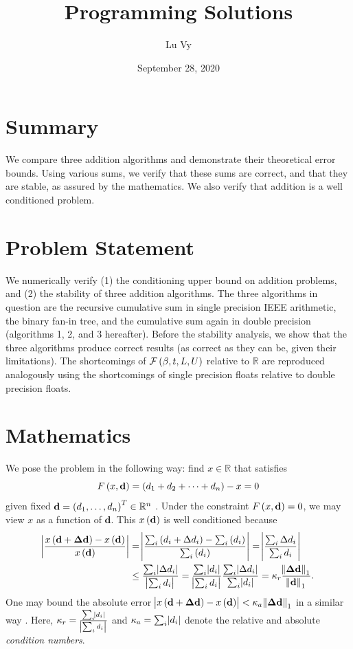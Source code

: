 \documentclass[12pt]{article}
\theoremstyle{definition}
\begin{document}
\begin{titlepage}
\title{Programming Solutions}
\author{Lu Vy}
\date{September 28, 2020}
\maketitle
\thispagestyle{empty}
\end{titlepage}

\section{Summary}
We compare three addition algorithms and demonstrate their theoretical error bounds. Using various sums, we verify that these sums are correct, and that they are stable, as assured by the mathematics. We also verify that addition is a well conditioned problem.

\section{Problem Statement}
We numerically verify (1) the conditioning upper bound on addition problems, and (2) the stability of three addition algorithms. The three algorithms in question are the recursive cumulative sum in single precision IEEE arithmetic, the binary fan-in tree, and the cumulative sum again in double precision (algorithms 1, 2, and 3 hereafter).  Before the stability analysis, we show that the three algorithms produce correct results (as correct as they can be, given their limitations). The shortcomings of $\mathcal{F}\del{\beta,t,L,U}$ relative to $\mathbb{R}$ are reproduced analogously using the shortcomings of single precision floats relative to double precision floats.

\section{Mathematics}
We pose the problem in the following way: find $x \in \mathbb{R}$ that satisfies $$F\del{x,\bf{d}} = \del{d_1 + d_2 + \cdots + d_n} - x = 0$$ given fixed $\mathbf{d} = \del{d_1,\dots,d_n}^T \in \mathbb{R}^n$ \cite{quateroni}. Under the constraint $F\del{x,\bf{d}} = 0$, we may view $x$ as a function of $\mathbf{d}$. This $x\del{\mathbf{d}}$ is well conditioned because
\begin{align*}
\abs{\frac{x\del{\mathbf{d+\Delta d}}-x\del{\mathbf{d}}}{x\del{\mathbf{d}}}} &=
\abs{\frac{\sum_i \del{d_i + \Delta d_i}-\sum_i\del{d_i}}{\sum_i\del{d_i}}} = \abs{\frac{\sum_i \Delta d_i}{\sum_i d_i}} \\ &\leq \frac{\sum_i \abs{\Delta d_i}}{\abs{\sum_i d_i}} = \frac{\sum_i\abs{d_i}}{\abs{\sum_i d_i}}\frac{\sum_i \abs{\Delta d_i}}{\sum_i \abs{d_i}} 
= \kappa_r\frac{\norm{\mathbf{\Delta d}}_1}{\norm{\mathbf{d}}_1}.
\end{align*}
One may bound the absolute error $\abs{x\del{\mathbf{d+\Delta d}}-x\del{\mathbf{d}}} < \kappa_a \norm{\mathbf{\Delta d}}_1$ in a similar way \cite{lec3}. Here, $\kappa_r = \frac{\sum_i\abs{d_i}}{\abs{\sum_i d_i}}$ and $\kappa_a = \sum_i\abs{d_i}$ denote the relative and absolute \textit{condition numbers}.
\end{document}
